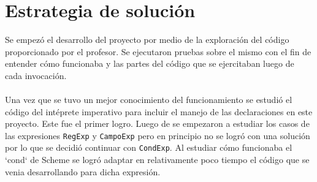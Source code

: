 \documentclass[12pt, times]{simauth}
\begin{document}

\title{
    { \fontsize{30}{1} \selectfont{
        Proyecto 2: Extensión del intérprete de un lenguaje funcional }
    }
}

\author{
    { \fontsize{14}{1} \selectfont{
        Carlos Martín Flores González, 2015183528 \\
        Willard Zamora Cárdenas, 2017239202\\
        Profesor: Ignacio Trejos Zelaya \\
        19 de Junio del 2018
        }
    }
}

%



\maketitle 

\pagebreak

\tableofcontents

\section{Estrategia de solución}
Se empezó el desarrollo del proyecto por medio de la exploración del código proporcionado por el profesor. Se ejecutaron pruebas sobre el mismo con el fin de entender cómo funcionaba y las partes del código que se ejercitaban luego de cada invocación.

\paragraph{}Una vez que se tuvo un mejor conocimiento del funcionamiento se estudió el código del intéprete imperativo para incluir el manejo de las declaraciones en este proyecto. Este fue el primer logro. Luego de se empezaron a estudiar los casos de las expresiones \texttt{RegExp} y \texttt{CampoExp} pero en principio no se logró con una solución por lo que se decidió continuar con \texttt{CondExp}. Al estudiar cómo funcionaba el `cond` de Scheme se logró adaptar en relativamente poco tiempo el código que se venia desarrollando para dicha expresión.
\end{document}
